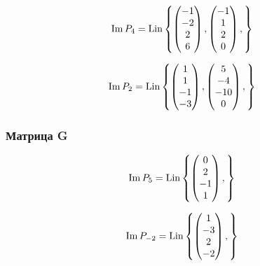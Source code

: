 \documentclass[12pt, a4paper]{article}
\begin{document}
    \begin{equation}
        \operatorname{Im} P_4  = \operatorname{Lin} \left\{ 
        \begin{pmatrix} -1 \\-2 \\ 2 \\6 \end{pmatrix},
        \begin{pmatrix} -1 \\ 1 \\ 2 \\ 0  \end{pmatrix},
        \right\}
    \end{equation}


    \begin{equation}
        \operatorname{Im} P_2  = \operatorname{Lin} \left\{ 
        \begin{pmatrix} 1 \\ 1 \\ -1 \\ -3 \end{pmatrix},
        \begin{pmatrix} 5 \\ -4 \\ -10 \\ 0  \end{pmatrix},
        \right\}
    \end{equation}


    
    \subsubsection{Матрица G}

    \begin{equation}
        \operatorname{Im} P_5  = \operatorname{Lin} \left\{ 
            \begin{pmatrix} 0 \\ 2 \\ -1 \\ 1 \end{pmatrix},
        \right\}
    \end{equation}


    \begin{equation}
        \operatorname{Im} P_{-2}  = \operatorname{Lin} \left\{ 
        \begin{pmatrix} 1 \\ -3 \\ 2 \\ -2 \end{pmatrix},
        \right\}
    \end{equation}
\end{document}
